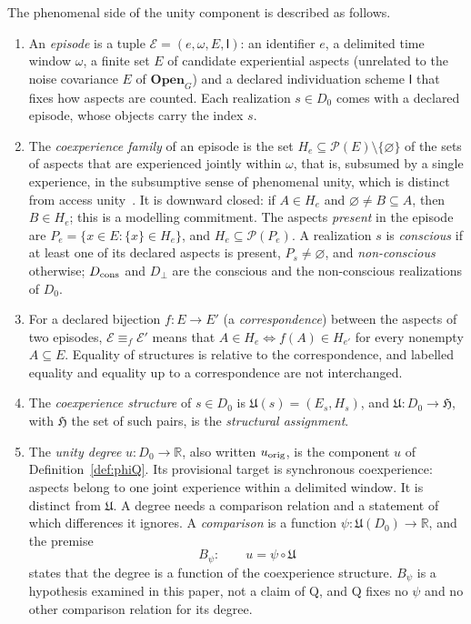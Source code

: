 \begin{definition}\label{def:unity}
The phenomenal side of the unity component is described as follows.
\begin{enumerate}
\item[(a)] An \emph{episode} is a tuple $\mathcal E=(e,\omega,E,\mathsf I)$: an identifier $e$, a delimited time window $\omega$, a finite set $E$ of candidate experiential aspects (unrelated to the noise covariance $E$ of $\mathbf{Open}_G$) and a declared individuation scheme $\mathsf I$ that fixes how aspects are counted. Each realization $s\in D_0$ comes with a declared episode, whose objects carry the index $s$.
\item[(b)] The \emph{coexperience family} of an episode is the set $H_e\subseteq\mathcal P(E)\setminus\{\varnothing\}$ of the sets of aspects that are experienced jointly within $\omega$, that is, subsumed by a single experience, in the subsumptive sense of phenomenal unity, which is distinct from access unity~\cite{BayneChalmers2003}. It is downward closed: if $A\in H_e$ and $\varnothing\ne B\subseteq A$, then $B\in H_e$; this is a modelling commitment. The aspects \emph{present} in the episode are $P_e=\{x\in E:\{x\}\in H_e\}$, and $H_e\subseteq\mathcal P(P_e)$. A realization $s$ is \emph{conscious} if at least one of its declared aspects is present, $P_s\ne\varnothing$, and \emph{non-conscious} otherwise; $D_{\rm cons}$ and $D_\bot$ are the conscious and the non-conscious realizations of $D_0$.
\item[(c)] For a declared bijection $f:E\to E'$ (a \emph{correspondence}) between the aspects of two episodes, $\mathcal E\equiv_f\mathcal E'$ means that $A\in H_e\Leftrightarrow f(A)\in H_{e'}$ for every nonempty $A\subseteq E$. Equality of structures is relative to the correspondence, and labelled equality and equality up to a correspondence are not interchanged.
\item[(d)] The \emph{coexperience structure} of $s\in D_0$ is $\mathfrak U(s)=(E_s,H_s)$, and $\mathfrak U:D_0\to\mathfrak H$, with $\mathfrak H$ the set of such pairs, is the \emph{structural assignment}.
\item[(e)] The \emph{unity degree} $u:D_0\to\mathbb R$, also written $u_{\rm orig}$, is the component $u$ of Definition~\ref{def:phiQ}. Its provisional target is synchronous coexperience: aspects belong to one joint experience within a delimited window. It is distinct from $\mathfrak U$. A degree needs a comparison relation and a statement of which differences it ignores. A \emph{comparison} is a function $\psi:\mathfrak U(D_0)\to\mathbb R$, and the premise
\[
B_\psi:\qquad u=\psi\circ\mathfrak U
\]
states that the degree is a function of the coexperience structure. $B_\psi$ is a hypothesis examined in this paper, not a claim of Q, and Q fixes no $\psi$ and no other comparison relation for its degree.
\end{enumerate}
\end{definition}

